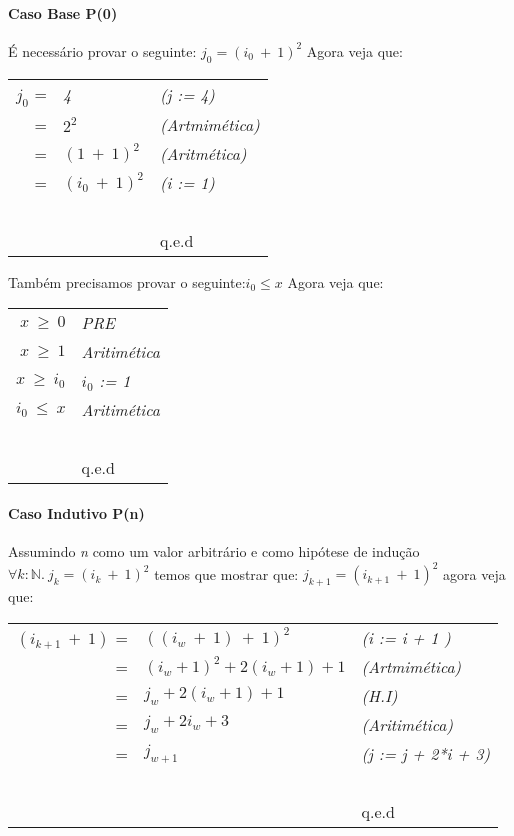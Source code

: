 \paragraph{Caso Base P(0)}
É necessário provar o seguinte: $ j_0 =(i_0\ +\ 1)^2 $ Agora veja que:
 \begin{center}
     \begin{tabular}{rll}
         \emph{$j_0$} =& \emph{4} & \emph{(j := 4)} \\
                      =& \emph{$2^2$}& \emph{(Artmimética)}\\ 
                      =& \emph{$(1\ +\ 1)^2$}& \emph{(Aritmética)}\\        
                      =& \emph{$(i_0\ +\ 1)^2$}& \emph{(i := 1)}\\ 
         ~&~&~\\
         ~&~&q.e.d\\
     \end{tabular}
 \end{center}
Também precisamos provar o seguinte:$i_0 \leq x$ Agora veja que:
 \begin{center}
     \begin{tabular}{rl}
         \emph{$x\ \geq\ 0$}& \emph{PRE} \\
         \emph{$x\ \geq\ 1$}& \emph{Aritimética} \\
         \emph{$x\ \geq\ i_0$}& \emph{$i_0$ := 1} \\
         \emph{$i_0\ \leq\ x$}& \emph{Aritimética} \\
         ~&~\\
         ~&q.e.d\\
     \end{tabular}
 \end{center}

\paragraph{Caso Indutivo P(n)}
Assumindo \emph{n} como um valor arbitrário e como hipótese de indução
$\forall k :\mathbb{N} .\ j_k=(i_k\ +\ 1)^2$ temos que mostrar que: 
$j_{k+1}=(i_{k+1}\ +\ 1)^2$ agora veja que:
 \begin{center}
     \begin{tabular}{rll}
         \emph{$(i_{k+1}\ +\ 1)$} =& \emph{$((i_w\ +\ 1)\ +\ 1)^2$} & \emph{(i := i + 1 )} \\
                                  =& \emph{$(i_w + 1)^2 + 2(i_w +1) + 1$}& \emph{(Artmimética)}\\ 
                                  =& \emph{$j_w + 2(i_w + 1) + 1$}& \emph{(H.I)}\\        
                                  =& \emph{$j_w + 2i_w + 3$}& \emph{(Aritimética)}\\ 
         =& \emph{$j_{w+1} $}& \emph{(j := j + 2*i + 3)}\\ 
         ~&~&~\\
         ~&~&q.e.d\\
     \end{tabular}
 \end{center}


